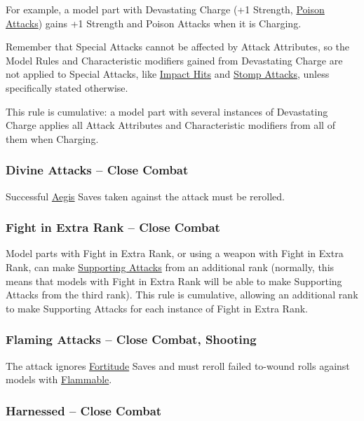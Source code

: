 For example, a model part with Devastating Charge (+1 Strength, \hyperref[poison_attacks]{Poison Attacks}) gains +1 Strength and Poison Attacks when it is Charging.

Remember that Special Attacks cannot be affected by Attack Attributes, so the Model Rules and Characteristic modifiers gained from Devastating Charge are not applied to Special Attacks, like \hyperref[impact_hits]{Impact Hits} and \hyperref[stomp_attacks]{Stomp Attacks}, unless specifically stated otherwise.

This rule is cumulative: a model part with several instances of Devastating Charge applies all Attack Attributes and Characteristic modifiers from all of them when Charging.

\subsubsection{Divine Attacks -- Close Combat}
\idx[main=y]{\divineattacks}\label{divine_attacks}

Successful \hyperref[aegis]{Aegis} Saves taken against the attack must be rerolled.

\subsubsection{Fight in Extra Rank -- Close Combat}
\idx[main=y]{\fightinextrarank}\label{fight_in_extra_rank}

Model parts with Fight in Extra Rank, or using a weapon with Fight in Extra Rank, can make \hyperref[supporting_attacks]{Supporting Attacks} from an additional rank (normally, this means that models with Fight in Extra Rank will be able to make Supporting Attacks from the third rank). This rule is cumulative, allowing an additional rank to make Supporting Attacks for each instance of Fight in Extra Rank.

\subsubsection{Flaming Attacks -- Close Combat, Shooting}
\idx[main=y]{\flamingattacks}\label{flaming_attacks}

The attack ignores \hyperref[fortitude]{Fortitude} Saves and must reroll failed to-wound rolls against models with \hyperref[flammable]{Flammable}.

\subsubsection{Harnessed -- Close Combat}
\idx[main=y]{\harnessed}\label{harnessed}

